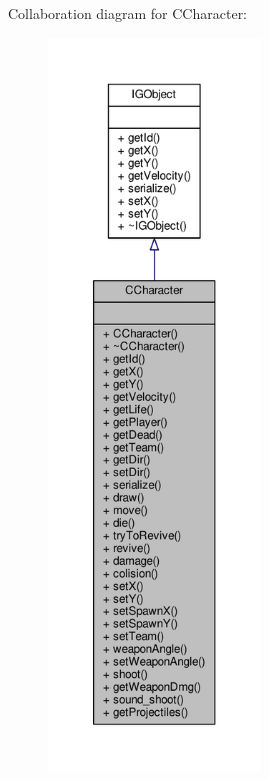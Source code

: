Collaboration diagram for C\+Character\+:\nopagebreak
\begin{figure}[H]
\begin{center}
\leavevmode
\includegraphics[height=550pt]{class_c_character__coll__graph}
\end{center}
\end{figure}
